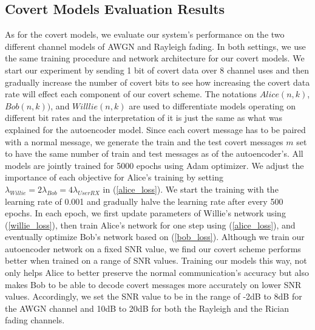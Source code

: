\subsection{Covert Models Evaluation Results}
As for the covert models, we evaluate our system's performance on the two different channel models of AWGN and Rayleigh fading. In both settings, we use the same training procedure and network architecture for our covert models. We start our experiment by sending 1 bit of covert data over 8 channel uses and then gradually increase the number of covert bits to see how increasing the covert data rate will effect each component of our covert scheme. The notations \(Alice (n,k)\), \(Bob (n,k))\), and \(Willlie (n,k)\) are used to differentiate models operating on different bit rates and the interpretation of it is just the same as what was explained for the autoencoder model. Since each covert message has to be paired with a normal message, we generate the train and the test covert messages \(m\) set to have the same number of train and test messages as of the autoencoder's. All models are jointly trained for 5000 epochs using Adam optimizer. We adjust the importance of each objective for Alice's training by setting \(\lambda_{Willie} = 2 \lambda_{Bob} = 4 \lambda_{UserRX}\) in (\ref{alice_loss}). We start the training with the learning rate of 0.001 and gradually halve the learning rate after every 500 epochs. In each epoch, we first update parameters of Willie's network using (\ref{willie_loss}), then train Alice's network for one step using (\ref{alice_loss}), and eventually optimize Bob's network based on (\ref{bob_loss}). Although we train our autoencoder network on a fixed SNR value, we find our covert scheme performs better when trained on a range of SNR values. Training our models this way, not only helps Alice to better preserve the normal communication's accuracy but also makes Bob to be able to decode covert messages more accurately on lower SNR values. Accordingly, we set the SNR value to be in the range of -2dB to 8dB for the AWGN channel and 10dB to 20dB for both the Rayleigh and the Rician fading channels.

